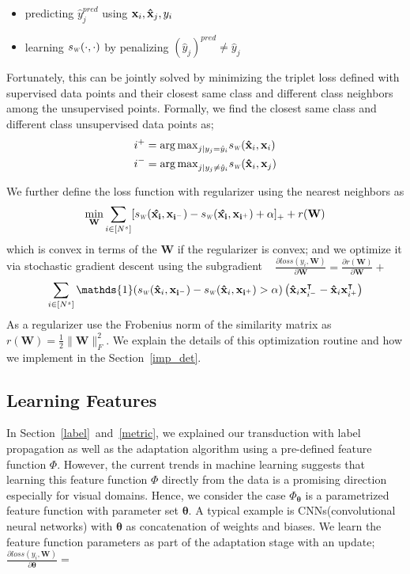 \begin{itemize}
\item predicting $\hat{y}^{pred}_j$ using $\mathbf{x}_i, \mathbf{\hat{x}}_j, y_i$
\item learning $\sw(\cdot,\cdot)$ by penalizing  $(\hat{y}_j)^{pred} \neq \hat{y}_j$ 
\end{itemize}

Fortunately, this can be jointly solved by minimizing the triplet loss defined with supervised data points and their closest same class and different class neighbors among the unsupervised points. Formally, we find the closest same class and different class unsupervised data points as;
\begin{equation}
\begin{aligned}
&i^{+} = {\arg\max}_{j | y_j = \hat{y}_i} \sw(\xsi, \xui) \\
&i^{-} = {\arg\max}_{j | y_j \neq \hat{y}_i} \sw(\xsi,\xuj) 
\label{sup_nn}
\end{aligned}
\end{equation}

We further define the loss function with regularizer using the nearest neighbors as
\begin{equation}
\min_{\mathbf{W}} \sum_{i \in [N^s]} [\sw(\mathbf{\hat{x_i}},\mathbf{x_{i^-}}) - \sw(\mathbf{\hat{x_i}},\mathbf{x_{i^+}}) + \alpha]_{+} + r(\mathbf{W})
\end{equation}
which is convex in terms of the $\mathbf{W}$ if the regularizer is convex; and we optimize it via stochastic gradient descent using the subgradient \
\mbox{$\frac{\partial loss (y_i, \mathbf{W})}{\partial \mathbf{W}} = \frac{\partial r ( \mathbf{W})}{\partial \mathbf{W}} + $}
\begin{equation}
\sum_{i \in [N^s]} \mathds{1}(\sw(\xsi,\mathbf{x_{i^-}}) - \sw(\xsi,\mathbf{x_{i^+}})>\alpha) \left( \xsi\mathbf{x}^\intercal_{i^-} - \xsi \mathbf{x}^\intercal_{i^+}  \right)  
\label{gradw}
\end{equation}
As a regularizer use the Frobenius norm of the similarity matrix as $r(\mathbf{W})=\frac{1}{2}\|\mathbf{W}\|_F^2$. We explain the details of this optimization routine and how we implement in the Section~\ref{imp_det}.
\subsection{Learning Features}
In Section~\ref{label}~and~\ref{metric}, we explained our transduction with label propagation as well as the adaptation algorithm using a pre-defined feature function $\Phi$. However, the current trends in machine learning suggests that learning this feature function $\Phi$ directly from the data  is a promising direction especially for visual domains. Hence, we consider the case $\Phi_{\mathbf{\theta}}$ is a parametrized feature function with parameter set $\mathbf{\theta}$. A typical example is CNNs(convolutional neural networks) with $\mathbf{\theta}$ as concatenation of weights and biases. We learn the feature function parameters as part of the adaptation stage with an update; $\frac{\partial loss (y_i, \mathbf{W})}{\partial \mathbf{\theta}} =$

